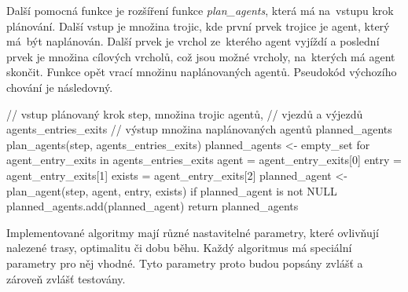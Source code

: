 Další pomocná funkce je rozšíření funkce \emph{plan\_agents}, která má na~vstupu krok plánování.
Další vstup je množina trojic, kde
první prvek trojice je agent, který má~být naplánován.
Další prvek je vrchol ze~kterého agent vyjíždí a
poslední prvek je množina cílových vrcholů, což jsou možné vrcholy, na~kterých má agent skončit.
Funkce opět vrací množinu naplánovaných agentů.
Pseudokód výchozího chování je následovný.
\begin{code}[xrightmargin=6em]
	// vstup plánovaný krok step, množina trojic agentů,
	// vjezdů a výjezdů agents_entries_exits
	// výstup množina naplánovaných agentů planned_agents
	plan_agents(step, agents_entries_exits)
	planned_agents <- empty_set
	for agent_entry_exits in agents_entries_exits
	agent = agent_entry_exits[0]
	entry = agent_entry_exits[1]
	exists = agent_entry_exits[2]
	planned_agent <- plan_agent(step, agent, entry, exists)
	if planned_agent is not NULL
	planned_agents.add(planned_agent)
	return planned_agents
\end{code}

Implementované algoritmy mají různé nastavitelné parametry, které ovlivňují nalezené trasy, optimalitu či dobu běhu.
Každý algoritmus má speciální parametry pro něj vhodné.
Tyto parametry proto budou popsány zvlášť a zároveň zvlášť testovány.








